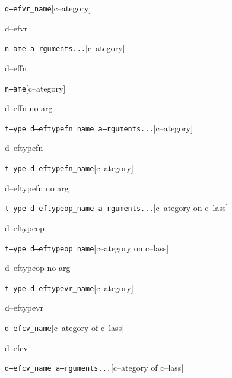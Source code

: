 \documentclass{book}
\begin{document}
\begin{titlepage}
\noindent\texttt\bgroup{}d--efvr\_name\egroup{}\hfill[c--ategory]



%
d--efvr

\noindent\texttt\bgroup{}n--ame a--rguments...\egroup{}\hfill[c--ategory]



%
d--effn

\noindent\texttt\bgroup{}n--ame\egroup{}\hfill[c--ategory]



%
d--effn no arg

\noindent\texttt\bgroup{}t--ype d--eftypefn\_name a--rguments...\egroup{}\hfill[c--ategory]



%
d--eftypefn

\noindent\texttt\bgroup{}t--ype d--eftypefn\_name\egroup{}\hfill[c--ategory]



%
d--eftypefn no arg

\noindent\texttt\bgroup{}t--ype d--eftypeop\_name a--rguments...\egroup{}\hfill[c--ategory on c--lass]



%
d--eftypeop

\noindent\texttt\bgroup{}t--ype d--eftypeop\_name\egroup{}\hfill[c--ategory on c--lass]



%
d--eftypeop no arg

\noindent\texttt\bgroup{}t--ype d--eftypevr\_name\egroup{}\hfill[c--ategory]



%
d--eftypevr

\noindent\texttt\bgroup{}d--efcv\_name\egroup{}\hfill[c--ategory of c--lass]



%
d--efcv

\noindent\texttt\bgroup{}d--efcv\_name a--rguments...\egroup{}\hfill[c--ategory of c--lass]




\end{titlepage}
\end{document}
